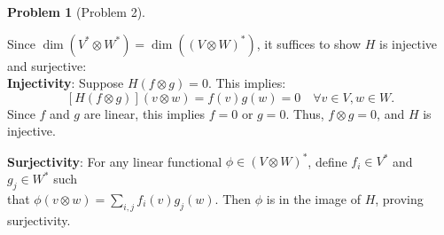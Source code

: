 \documentclass[12pt]{article}
\theoremstyle{definition}
\newtheorem{problem}{Problem}
\begin{document}
\begin{problem}[Problem 2]
\begin{solution}
        Since \( \dim(V^* \otimes W^*) = \dim((V \otimes W)^*) \), it suffices to show \( H \) is injective and surjective:\\
        \textbf{Injectivity}: Suppose \( H(f \otimes g) = 0 \). This implies:
          \[
          [H(f \otimes g)](v \otimes w) = f(v) g(w) = 0 \quad \forall v \in V, w \in W.
          \]
          Since \( f \) and \( g \) are linear, this implies \( f = 0 \) or \( g = 0 \). Thus, \( f \otimes g = 0 \), and \( H \) is injective.

        \textbf{Surjectivity}: For any linear functional \( \phi \in (V \otimes W)^* \), define \( f_i \in V^* \) and \( g_j \in W^* \) such\\
        that \( \phi(v \otimes w) = \sum_{i,j} f_i(v) g_j(w) \). Then \( \phi \) is in the image of \( H \), proving surjectivity.
    
    \end{solution}
\end{problem}
\end{document}
